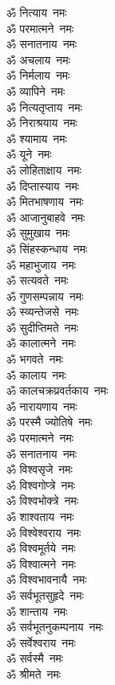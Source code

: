 \begin{multicols}{2}
\begin{flushleft}
ॐ नित्याय~नमः\\
ॐ परमात्मने~नमः\\
ॐ सनातनाय~नमः\hfill{}\\
ॐ अचलाय~नमः\\
ॐ निर्मलाय~नमः\\
ॐ व्यापिने~नमः\\
ॐ नित्यतृप्ताय~नमः\\
ॐ निराश्रयाय~नमः\\
ॐ श्यामाय~नमः\\
ॐ यूने~नमः\\
ॐ लोहिताक्षाय~नमः\\
ॐ दिप्तास्याय~नमः\\
ॐ मितभाषणाय~नमः\hfill{}\\
ॐ आजानुबाहवे~नमः\\
ॐ सुमुखाय~नमः\\
ॐ सिंहस्कन्धाय~नमः\\
ॐ महाभुजाय~नमः\\
ॐ सत्यवते~नमः\\
ॐ गुणसम्पन्नाय~नमः\\
ॐ स्व्यन्तेजसे~नमः\\
ॐ सुदीप्तिमते~नमः\\
ॐ कालात्मने~नमः\\
ॐ भगवते~नमः\hfill{}\\
ॐ कालाय~नमः\\
ॐ कालचक्रप्रवर्तकाय~नमः\\
ॐ नारायणाय~नमः\\
ॐ परस्मै ज्योतिषे~नमः\\
ॐ परमात्मने~नमः\\
ॐ सनातनाय~नमः\\
ॐ विश्वसृजे~नमः\\
ॐ विश्वगोप्त्रे~नमः\\
ॐ विश्वभोक्त्रे~नमः\\
ॐ शाश्वताय~नमः\hfill{}\\
ॐ विश्वेश्वराय~नमः\\
ॐ विश्वमूर्तये~नमः\\
ॐ विश्वात्मने~नमः\\
ॐ विश्वभावनायै~नमः\\
ॐ सर्वभूतसुहृदे~नमः\\
ॐ शान्ताय~नमः\\
ॐ सर्वभूतनुकम्पनाय~नमः\\
ॐ सर्वेश्वराय~नमः\\
ॐ सर्वस्मै~नमः\\
ॐ श्रीमते~नमः\hfill{}\\

\end{flushleft}
\end{multicols}
